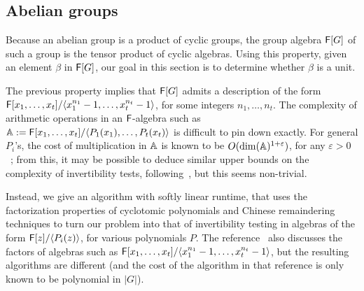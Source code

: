 
\subsection{Abelian groups}

Because an abelian group is a product of cyclic groups, the group
algebra ${\mathsf{F}}[G]$ of such a group is the tensor product of cyclic
algebras. Using this property, given an element $\beta$ in ${\mathsf{F}}[G]$,
our goal in this section is to determine whether $\beta$ is a unit.

The previous property implies that ${\mathsf{F}}[G]$ admits a description of the
form ${\mathsf{F}}[x_1,\dots,x_t]/\langle x_1^{n_1}-1,\dots,x_t^{n_t}-1\rangle$,
for some integers $n_1,\dots,n_t$. The complexity of arithmetic
operations in an ${\mathsf{F}}$-algebra such as $\mathbb{A}:={\mathsf{F}}[x_1,\dots,x_t]/\langle
P_1(x_1),\dots,P_t(x_t)\rangle$ is difficult to pin down exactly. For
general $P_i$'s, the cost of multiplication in $\mathbb{A}$ is known to be
$O(\dim(\mathbb{A})^{1+\varepsilon})$, for any $\varepsilon >
0$~\cite[Theorem~2]{LiMoSc09}; from this, it may be possible to deduce
similar upper bounds on the complexity of invertibility tests,
following~\cite{DaMMMScXi06}, but this seems non-trivial.

Instead, we give an algorithm with softly linear runtime, that uses
the factorization properties of cyclotomic polynomials and Chinese
remaindering techniques to turn our problem into that of invertibility
testing in algebras of the form ${\mathsf{F}}[z]/\langle P_i(z) \rangle$, for
various polynomials $P$. The reference~\cite{Pol94} also discusses the
factors of algebras such as ${\mathsf{F}}[x_1,\dots,x_t]/\langle
x_1^{n_1}-1,\dots,x_t^{n_t}-1\rangle$, but the resulting algorithms are 
different (and the cost of the algorithm in that reference 
is only known to be polynomial in $|G|$).

\smallskip

